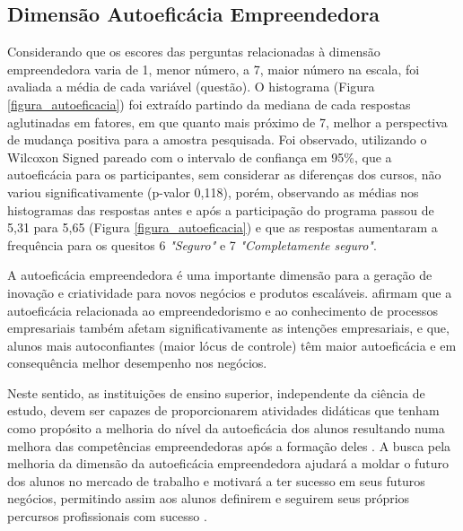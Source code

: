 



\subsection{Dimensão Autoeficácia Empreendedora}

Considerando que os escores das perguntas relacionadas à dimensão empreendedora varia de 1, menor número, a 7, maior número na escala, foi avaliada a média de cada variável (questão). O histograma (Figura \ref{figura_autoeficacia}) foi extraído partindo da mediana de cada respostas aglutinadas em fatores, em que quanto mais próximo de 7, melhor a perspectiva de mudança positiva para a amostra pesquisada. Foi observado, utilizando o Wilcoxon Signed pareado com o intervalo de confiança em 95\%, que a autoeficácia para os participantes, sem considerar as diferenças dos cursos, não variou significativamente (p-valor 0,118), porém, observando as médias nos histogramas das respostas antes e após a participação do programa passou de 5,31 para 5,65 (Figura \ref{figura_autoeficacia}) e que as respostas aumentaram a frequência para os quesitos 6 \textit{"Seguro"} e 7 \textit{"Completamente seguro"}.

A autoeficácia empreendedora é uma importante dimensão para a geração de inovação e criatividade para novos negócios e produtos escaláveis.  afirmam que a autoeficácia relacionada ao empreendedorismo e ao conhecimento de processos empresariais também afetam significativamente as intenções empresariais, e que, alunos mais autoconfiantes (maior lócus de controle) têm maior autoeficácia e em consequência melhor desempenho nos negócios.

Neste sentido, as instituições de ensino superior, independente da ciência de estudo, devem ser capazes de proporcionarem atividades didáticas que tenham como propósito a melhoria do nível da autoeficácia dos alunos resultando numa melhora das competências empreendedoras após a formação deles \cite{ribeiro_autoeficacia_2019}. A busca pela melhoria da dimensão da autoeficácia empreendedora ajudará a moldar o futuro dos alunos no mercado de trabalho e motivará a ter sucesso em seus futuros negócios, permitindo assim aos alunos definirem e seguirem seus próprios percursos profissionais com sucesso \cite{das_examining_2018}.

